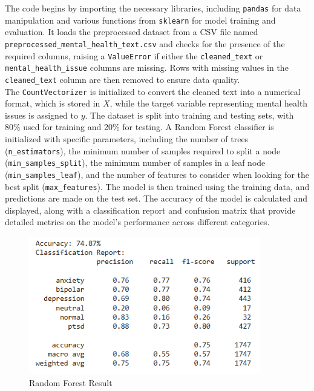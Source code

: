 \noindent
The code begins by importing the necessary libraries, including \texttt{pandas} for data manipulation and various functions from \texttt{sklearn} for model training and evaluation. It loads the preprocessed dataset from a CSV file named \texttt{preprocessed\_mental\_health\_text.csv} and checks for the presence of the required columns, raising a \texttt{ValueError} if either the \texttt{cleaned\_text} or \texttt{mental\_health\_issue} columns are missing. Rows with missing values in the \texttt{cleaned\_text} column are then removed to ensure data quality. \\

\noindent
The \texttt{CountVectorizer} is initialized to convert the cleaned text into a numerical format, which is stored in \(X\), while the target variable representing mental health issues is assigned to \(y\). The dataset is split into training and testing sets, with 80\% used for training and 20\% for testing. A Random Forest classifier is initialized with specific parameters, including the number of trees (\texttt{n\_estimators}), the minimum number of samples required to split a node (\texttt{min\_samples\_split}), the minimum number of samples in a leaf node (\texttt{min\_samples\_leaf}), and the number of features to consider when looking for the best split (\texttt{max\_features}). The model is then trained using the training data, and predictions are made on the test set. The accuracy of the model is calculated and displayed, along with a classification report and confusion matrix that provide detailed metrics on the model's performance across different categories.

\begin{figure}[h!]  
    \centering
    \includegraphics[width=0.9\textwidth]{Images/Output RF.png}  
    \caption{Random Forest Result}
    \label{Random Forest}  %
\end{figure}

